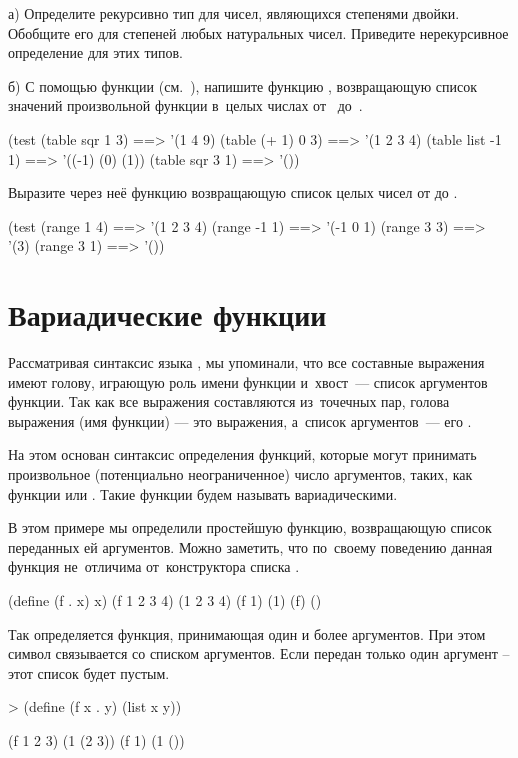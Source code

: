 \newpage
\begin{Assignment}
а) Определите рекурсивно тип для чисел, являющихся степенями двойки. Обобщите его для степеней любых натуральных чисел. Приведите нерекурсивное определение для этих типов.
\medskip

б) С помощью функции  (см.~), напишите функцию , возвращающую список значений произвольной функции  в~целых числах от~ до~.

\begin{Specification}
(test 
  (table sqr 1 3)    ==> '(1 4 9)
  (table (+ 1) 0 3)  ==> '(1 2 3 4)
  (table list -1 1)  ==> '((-1) (0) (1))
  (table sqr 3 1)    ==> '())
\end{Specification}

Выразите через неё функцию  возвращающую список целых чисел от  до .
\begin{Specification}
(test 
  (range 1 4)   ==> '(1 2 3 4)
  (range -1 1)  ==> '(-1 0 1)
  (range 3 3)   ==> '(3)
  (range 3 1)   ==> '())
\end{Specification}
\end{Assignment}

\section{Вариадические функции}%
Рассматривая синтаксис языка \Scheme, мы упоминали, что все составные выражения имеют голову, играющую роль имени функции и~хвост~--- список аргументов функции. Так как все выражения \Scheme составляются из~точечных пар, голова выражения (имя функции) --- это  выражения, а~список аргументов~--- его .

На этом основан синтаксис определения функций, которые могут принимать произвольное (потенциально неограниченное) число аргументов, таких, как функции \s{+} или \s{-}. Такие функции будем называть вариадическими.

\begin{example}{%
В этом примере мы определили простейшую функцию, возвращающую список переданных ей аргументов. Можно заметить, что по~своему поведению данная функция не~отличима от~конструктора списка .}

\REPLin
  {(define (f . x) x)}
\REPL
  {(f 1 2 3 4)}
  {(1 2 3 4)}
\REPL
  {(f 1)}
  {(1)}
\REPL
  {(f)}
  {()}
\end{example}
\vspace{-\bigskipamount}
\begin{example}{%
Так определяется функция, принимающая один и более аргументов. При этом символ  связывается со списком аргументов. Если передан только один аргумент -- этот список будет пустым.}

\begin{ExampleCode}[emph={x,y}]
> (define (f x . y)
    (list x y))
\end{ExampleCode}
\REPL
  {(f 1 2 3)}
  {(1 (2 3))}
\REPL
  {(f 1)}
  {(1 ())}
\end{example}

